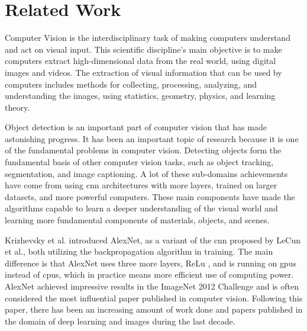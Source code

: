\label{sec:2_related_work}
\section{Related Work} 

Computer Vision is the interdisciplinary task of making computers understand and act on visual input. This scientific discipline's main objective is to make computers extract high-dimensional data from the real world, using digital images and videos. The extraction of visual information that can be used by computers includes methods for collecting, processing, analyzing, and understanding the images, using statistics, geometry, physics, and learning theory. 

Object detection is an important part of computer vision that has made astonishing progress. It has been an important topic of research because it is one of the fundamental problems in computer vision. Detecting objects form the fundamental basis of other computer vision tasks, such as object tracking, segmentation, and image captioning. A lot of these sub-domains achievements have come from using \gls{cnn} architectures with more layers, trained on larger datasets, and more powerful computers. These main components have made the algorithms capable to learn a deeper understanding of the visual world and learning more fundamental components of materials, objects, and scenes.  

Krizhevsky et al. introduced AlexNet\cite{krizhevskyImageNetClassificationDeep2017}, as a variant of the \gls{cnn} proposed by LeCun et al.\cite{lecunHandwrittenDigitRecognition1989}, both utilizing the backpropagation algorithm\cite{rumelhartLearningRepresentationsBackpropagating1986}
in training. The main difference is that AlexNet uses three more layers, ReLu\cite{fukushimaCognitronSelforganizingMultilayered1975}
, and is running on \glspl{gpu} instead of \glspl{cpu}, which in practice means more efficient use of computing power.
AlexNet achieved impressive results in the ImageNet\cite{dengImageNetLargeScaleHierarchical2009} 2012 Challenge and is often considered the most influential paper published in computer vision. 
Following this paper, there has been an increasing amount of work done and papers published in the domain of deep learning and images during the last decade.






